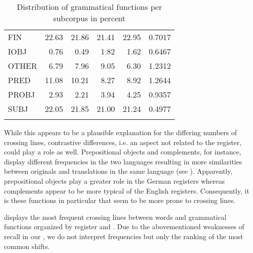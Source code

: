 \documentclass[output=paper]{LSP/langsci}
\begin{document}
\begin{table}
\begin{tabular}{lrrrrr}
FIN & 22.63 & 21.86 & 21.41 & 22.95 & 0.7017\\
IOBJ & 0.76 & 0.49 & 1.82 & 1.62 & 0.6467\\
OTHER & 6.79 & 7.96 & 9.05 & 6.30 & 1.2312\\
PRED & 11.08 & 10.21 & 8.27 & 8.92 & 1.2644\\
PROBJ & 2.93 & 2.21 & 3.94 & 4.25 & 0.9357\\
SUBJ & 22.05 & 21.85 & 21.00 & 21.24 & 0.4977\\
\lspbottomrule
\end{tabular}
\caption{Distribution of grammatical functions per subcorpus in percent}
\label{tab:culo:3}
\end{table}


While this appears to be a plausible explanation for the differing numbers of crossing lines, contrastive differences, i.e. an aspect not related to the register, could play a role as well. Prepositional objects and complements, for instance, display different frequencies in the two languages resulting in more similarities between originals and translations in the same language (see ). Apparently, prepositional objects play a greater role in the German registers whereas complements appear to be more typical of the English registers. Consequently, it is these functions in particular that seem to be more prone to crossing lines.

 displays the most frequent crossing lines between words and grammatical functions organized by register and . Due to the abovementioned weaknesses of recall in our , we do not interpret frequencies but only the ranking of the most common shifts. 
\end{document}
